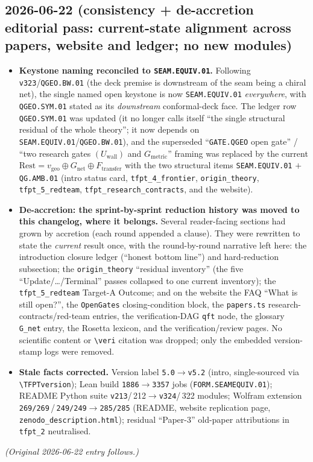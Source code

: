 \documentclass[11pt]{article}
\begin{document}
\subsection*{2026-06-22 (consistency + de-accretion editorial pass: current-state alignment across papers, website and ledger; no new modules)}
\begin{itemize}
\item \textbf{Keystone naming reconciled to \texttt{SEAM.EQUIV.01}.} Following \texttt{v323}/\texttt{QGEO.BW.01}
  (the deck premise is downstream of the seam being a chiral net), the single named open keystone is now
  \texttt{SEAM.EQUIV.01} \emph{everywhere}, with \texttt{QGEO.SYM.01} stated as its \emph{downstream}
  conformal-deck face. The ledger row \texttt{QGEO.SYM.01} was updated (it no longer calls itself ``the single
  structural residual of the whole theory''; it now depends on \texttt{SEAM.EQUIV.01}/\texttt{QGEO.BW.01}), and
  the superseded ``\texttt{GATE.QGEO} open gate'' / ``two research gates $(U_{\mathrm{wall}})$ and
  $G_{\mathrm{metric}}$'' framing was replaced by the current $\text{Rest}=v_{\mathrm{geo}}\oplus G_{\mathrm{net}}
  \oplus F_{\mathrm{transfer}}$ with the two structural items \texttt{SEAM.EQUIV.01} $+$ \texttt{QG.AMB.01}
  (intro status card, \texttt{tfpt\_4\_frontier}, \texttt{origin\_theory}, \texttt{tfpt\_5\_redteam},
  \texttt{tfpt\_research\_contracts}, and the website).
\item \textbf{De-accretion: the sprint-by-sprint reduction history was moved to this changelog, where it belongs.}
  Several reader-facing sections had grown by accretion (each round appended a clause). They were rewritten to
  state the \emph{current} result once, with the round-by-round narrative left here: the introduction closure
  ledger (``honest bottom line'') and hard-reduction subsection; the \texttt{origin\_theory} ``residual
  inventory'' (the five ``Update/\ldots/Terminal'' passes collapsed to one current inventory); the
  \texttt{tfpt\_5\_redteam} Target-A Outcome; and on the website the FAQ ``What is still open?'', the
  \texttt{OpenGates} closing-condition block, the \texttt{papers.ts} research-contracts/red-team entries, the
  verification-DAG \texttt{qft} node, the glossary \texttt{G\_net} entry, the Rosetta lexicon, and the
  verification/review pages. No scientific content or \texttt{\textbackslash veri} citation was dropped; only the
  embedded version-stamp logs were removed.
\item \textbf{Stale facts corrected.} Version label \texttt{5.0}$\to$\texttt{v5.2} (intro, single-sourced via
  \texttt{\textbackslash TFPTversion}); Lean build \texttt{1886}$\to$\texttt{3357} jobs (\texttt{FORM.SEAMEQUIV.01});
  README Python suite \texttt{v213}/\,212$\to$\texttt{v324}/\,322 modules; Wolfram extension
  \texttt{269/269}\,/\,\texttt{249/249}$\to$\texttt{285/285} (README, website replication page,
  \texttt{zenodo\_description.html}); residual ``Paper-3'' old-paper attributions in \texttt{tfpt\_2} neutralised.
\end{itemize}
\noindent\emph{(Original 2026-06-22 entry follows.)}
\end{document}
